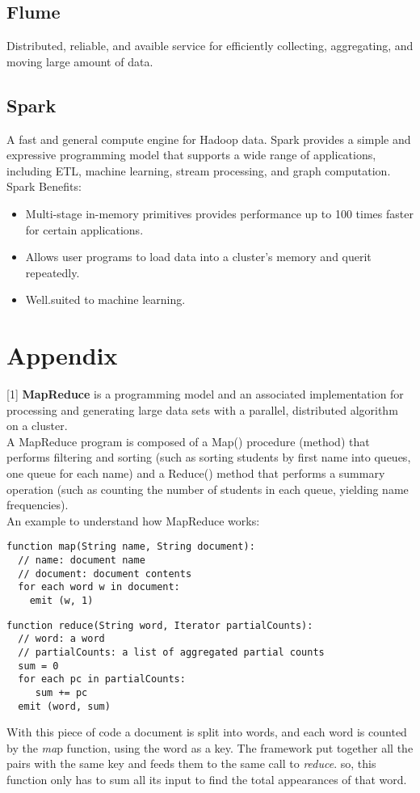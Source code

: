 \documentclass{article}
\begin{document}
\subsection{Flume}
Distributed, reliable, and avaible service for efficiently collecting, aggregating, and moving large amount of data. 
\subsection{Spark}
A fast and general compute engine for Hadoop data. Spark provides a simple and expressive programming model that supports a wide range of applications, including ETL, machine learning, stream processing, and graph computation. Spark Benefits: 
\begin{itemize}
\item Multi-stage in-memory primitives provides performance up to 100 times faster for certain applications.
\item Allows user programs to load data into a cluster's memory and querit repeatedly. 
\item Well.suited to machine learning. 
\end{itemize}

\section*{\color{blue}Appendix\color{black}}
[1] \textbf{MapReduce} is a programming model and an associated implementation for processing and generating large data sets with a parallel, distributed algorithm on a cluster. \\
A MapReduce program is composed of a Map() procedure (method) that performs filtering and sorting (such as sorting students by first name into queues, one queue for each name) and a Reduce() method that performs a summary operation (such as counting the number of students in each queue, yielding name frequencies). \\
An example to understand how MapReduce works: 
\begin{verbatim}
function map(String name, String document):
  // name: document name
  // document: document contents
  for each word w in document:
    emit (w, 1)
\end{verbatim}
\begin{verbatim}
function reduce(String word, Iterator partialCounts):
  // word: a word
  // partialCounts: a list of aggregated partial counts
  sum = 0
  for each pc in partialCounts:
     sum += pc
  emit (word, sum)
\end{verbatim}
With this piece of code a document is split into words, and each word is counted by the \textit{ma}p function, using the word as a key. The framework put together all the pairs with the same key and feeds them to the same call to \textit{reduce}. so, this function only has to sum all its input to find the total appearances of that word. 
\end{document}

